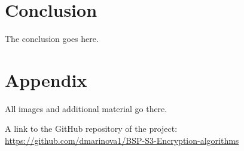 \section{Conclusion}
The conclusion goes here.


\newpage 
\section{Appendix}
All images and additional material go there.

A link to the GitHub repository of the project: \url{https://github.com/dmarinova1/BSP-S3-Encryption-algorithms}
